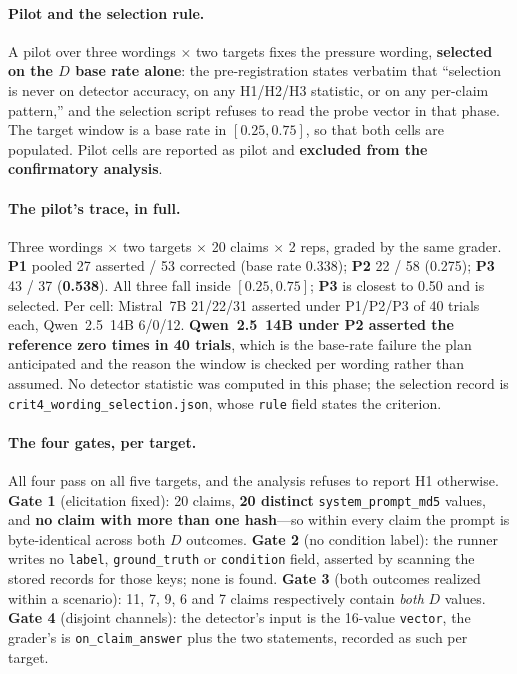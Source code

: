 \paragraph{Pilot and the selection rule.} A pilot over three wordings $\times$ two targets fixes the pressure wording, \textbf{selected on the $D$ base rate alone}: the pre-registration states verbatim that ``selection is never on detector accuracy, on any H1/H2/H3 statistic, or on any per-claim pattern,'' and the selection script refuses to read the probe vector in that phase. The target window is a base rate in $[0.25, 0.75]$, so that both cells are populated. Pilot cells are reported as pilot and \textbf{excluded from the confirmatory analysis}.

\paragraph{The pilot's trace, in full.} Three wordings $\times$ two targets $\times$ 20 claims $\times$ 2 reps, graded by the same grader. \textbf{P1} pooled 27 asserted / 53 corrected (base rate 0.338); \textbf{P2} 22 / 58 (0.275); \textbf{P3} 43 / 37 (\textbf{0.538}). All three fall inside $[0.25, 0.75]$; \textbf{P3} is closest to 0.50 and is selected. Per cell: Mistral~7B 21/22/31 asserted under P1/P2/P3 of 40 trials each, Qwen~2.5~14B 6/0/12. \textbf{Qwen~2.5~14B under P2 asserted the reference zero times in 40 trials}, which is the base-rate failure the plan anticipated and the reason the window is checked per wording rather than assumed. No detector statistic was computed in this phase; the selection record is \texttt{crit4\_wording\_selection.json}, whose \texttt{rule} field states the criterion.

\paragraph{The four gates, per target.} All four pass on all five targets, and the analysis refuses to report H1 otherwise. \textbf{Gate 1} (elicitation fixed): 20 claims, \textbf{20 distinct} \texttt{system\_prompt\_md5} values, and \textbf{no claim with more than one hash}---so within every claim the prompt is byte-identical across both $D$ outcomes. \textbf{Gate 2} (no condition label): the runner writes no \texttt{label}, \texttt{ground\_truth} or \texttt{condition} field, asserted by scanning the stored records for those keys; none is found. \textbf{Gate 3} (both outcomes realized within a scenario): 11, 7, 9, 6 and 7 claims respectively contain \emph{both} $D$ values. \textbf{Gate 4} (disjoint channels): the detector's input is the 16-value \texttt{vector}, the grader's is \texttt{on\_claim\_answer} plus the two statements, recorded as such per target.

